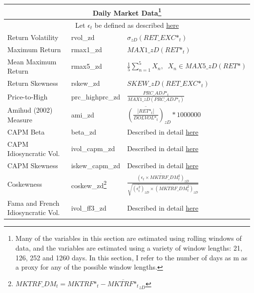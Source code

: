 \documentclass[12pt,title,fleqn]{article}
\begin{document}
{\begin{longtable}{@{\extracolsep{\fill}}|m{5cm}|l|m{8cm}|@{}}
	\hline
	\multicolumn{3}{|c|}{\textbf{\hypertarget{factors2}{Daily Market Data}\footnote{{Many of the variables in this section are estimated using rolling windows of data, and the variables are estimated using a variety of window lengths: 21, 126, 252 and 1260 days. In this section, I refer to the number of days as m as a proxy for any of the possible window lengths.}}}} \\
	\hline
	
	\multicolumn{3}{|c|}{Let $\epsilon_t$ be defined as described \hyperlink{ep_capm}{here}}\\

    \hline
	
	Return Volatility & rvol\_zd & $\sigma_{zD}(RET\_EXC\mbox{*}_t)$\\
	
	Maximum Return & rmax1\_zd &$MAX1\_zD(RET\mbox{*}_t)$\\
	
	Mean Maximum Return & rmax5\_zd &$\frac{1}{5}\sum_{n = 1}^5 X_n, \;\; X_n \in MAX5\_zD(RET\mbox{*})$ \\
	
	Return Skewness & rskew\_zd & $ SKEW\_zD(RET\_EXC\mbox{*}_t)$\\
    
    Price-to-High & prc\_highprc\_zd & $\frac{PRC\_ADJ\mbox{*}_t}{MAX1\_zD(PRC\_ADJ\mbox{*}_t)}$\\
    
    Amihud (2002) Measure & ami\_zd &$\overline{\left(\frac{|RET\mbox{*}_t|}{DOLVOL\mbox{*}_t}\right)}_{zD}*1000000$ \\
    
    CAPM Beta & beta\_zd & Described in detail \hyperlink{factors}{here} \\
    
    CAPM Idiosyncratic Vol. & ivol\_capm\_zd & Described in detail \hyperlink{factors}{here}\\
    
    CAPM Skewness & iskew\_capm\_zd & Described in detail \hyperlink{factors}{here} \\

    Coskewness & coskew\_zd\footnote{$MKTRF\_DM_t = MKTRF\mbox{*}_t - \overline{MKTRF\mbox{*}_t}_{zD}$} &$\frac{\overline{(\epsilon_t \times MKTRF\_DM_t^2)}_{zD}}{\sqrt{\overline{(\epsilon_t^2)}_{zD} \times \overline{(MKTRF\_DM_t^2)}_{zD}}}$\\
    
    Fama and French Idiosyncratic Vol. & ivol\_ff3\_zd & Described in detail \hyperlink{factors}{here}\\ 
     

\end{longtable}}
\end{document}
